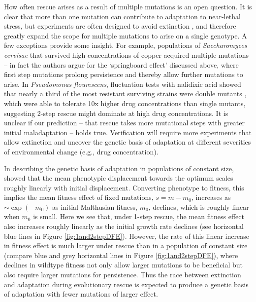 \documentclass[9pt,twocolumn,twoside,lineno]{gsajnl}
\begin{document}
How often rescue arises as a result of multiple mutations is an open question. 
It is clear that more than one mutation can contribute to adaptation to near-lethal stress, but experiments are often designed to avoid extinction \citep[reviewed in][]{cowen2002evolution}, and therefore greatly expand the scope for multiple mutations to arise on a single genotype.
A few exceptions provide some insight.
For example, populations of \textit{Saccharomyces cervisae} that survived high concentrations of copper acquired multiple mutations \citep{Gerstein2015} -- in fact the authors argue for the `springboard effect' discussed above, where first step mutations prolong persistence and thereby allow further mutations to arise.
In \textit{Pseudomonas flourescens}, fluctuation tests with nalidixic acid showed that nearly a third of the most resistant surviving strains were double mutants \citep{Bataillon2011}, which were able to tolerate 10x higher drug concentrations than single mutants, suggesting 2-step rescue might dominate at high drug concentrations.
It is unclear if our prediction --  that rescue takes more mutational steps with greater initial maladaptation -- holds true. 
Verification will require more experiments that allow extinction and uncover the genetic basis of adaptation at different severities of environmental change (e.g., drug concentration).

In describing the genetic basis of adaptation in populations of constant size, \cite{Orr1998} showed that the mean phenotypic displacement towards the optimum scales roughly linearly with initial displacement.
Converting phenotype to fitness, this implies the mean fitness effect of fixed mutations, $s=m-m_0$, increases as $\sim \exp(-m_0)$ as initial Malthusian fitness, $m_0$, declines, which is roughly linear when $m_0$ is small.
Here we see that, under 1-step rescue, the mean fitness effect also increases roughly linearly as the initial growth rate declines (see horizontal blue lines in Figure \ref{fig:1and2stepDFE}).
However, the rate of this linear increase in fitness effect is much larger under rescue than in a population of constant size (compare blue and grey horizontal lines in Figure \ref{fig:1and2stepDFE}), where declines in wildtype fitness not only allow larger mutations to be beneficial but also require larger mutations for persistence.
Thus the race between extinction and adaptation during evolutionary rescue is expected to produce a genetic basis of adaptation with fewer mutations of larger effect.
\end{document}
